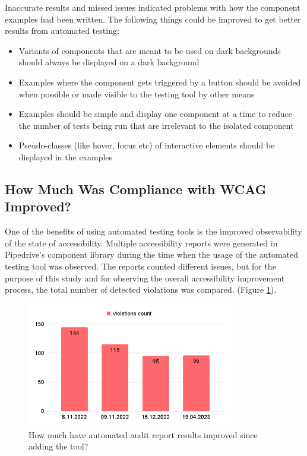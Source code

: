 \documentclass{master_thesis}
\begin{document}
Inaccurate results and missed issues indicated problems with how the component examples had been written. The following things could be improved to get better results from automated testing:
\begin{itemize}
	\item Variants of components that are meant to be used on dark backgrounds should always be displayed on a dark background
	\item Examples where the component gets triggered by a button should be avoided when possible or made visible to the testing tool by other means
	\item Examples should be simple and display one component at a time to reduce the number of tests being run that are irrelevant to the isolated component
	\item Pseudo-classes (like hover, focus etc) of interactive elements should be displayed in the examples
\end{itemize}

\subsection{How Much Was Compliance with WCAG Improved?}

One of the benefits of using automated testing tools is the improved observability of the state of accessibility.
Multiple accessibility reports were generated in Pipedrive's component library during the time when the usage of the automated testing tool was observed. The reports counted different
issues, but for the purpose of this study and for observing the overall accessibility improvement process, the total number of detected violations was compared. (Figure \ref{fig:automted-reports}).

\begin{figure}[ht]
	\centering
	\includegraphics[width=0.8\textwidth]{img/automated-audit-reports.png}
	\caption{How much have automated audit report results improved since adding the tool?}
	\label{fig:automted-reports}
\end{figure}
\end{document}
